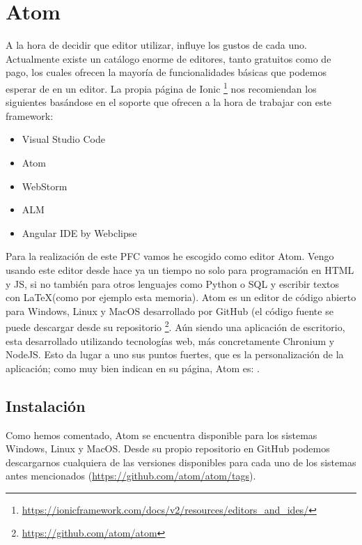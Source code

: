 \chapter{Atom} \label{ch:atom}

A la hora de decidir que editor utilizar, influye los gustos de cada uno.  Actualmente existe un catálogo enorme de editores, tanto gratuitos como de pago, los cuales ofrecen la mayoría de funcionalidades básicas que podemos esperar de en un editor.
La propia página de Ionic \footnote{\url{https://ionicframework.com/docs/v2/resources/editors_and_ides/}} nos recomiendan los siguientes basándose en el soporte que ofrecen a la hora de trabajar con este framework:
\begin{itemize}
\item Visual Studio Code
\item Atom
\item WebStorm
\item ALM
\item Angular IDE by Webclipse
\end{itemize}


Para la realización de este \gls{PFC} vamos he escogido como editor Atom. Vengo usando este editor desde hace ya un tiempo no solo para programación en HTML y JS, si no también para otros lenguajes como Python o SQL y escribir textos con \LaTeX (como por ejemplo esta memoria).
Atom es un editor de código abierto para Windows, Linux y MacOS desarrollado por GitHub (el código fuente se puede descargar desde su repositorio \footnote{\url{https://github.com/atom/atom}}. Aún siendo una aplicación de escritorio, esta desarrollado utilizando tecnologías web, más concretamente Chronium y NodeJS. Esto da lugar a uno sus puntos fuertes, que es la personalización de la aplicación; como muy bien indican en su página, Atom es: .

\section{Instalación}

Como hemos comentado, Atom se encuentra disponible para los sistemas Windows, Linux y MacOS. Desde su propio repositorio en GitHub podemos descargarnos cualquiera de las versiones disponibles para cada uno de los sistemas antes mencionados (\url{https://github.com/atom/atom/tags}).

